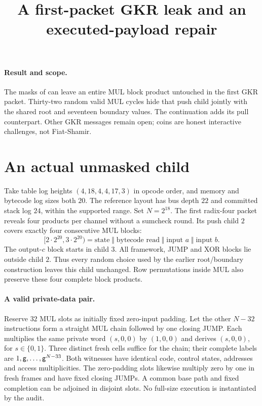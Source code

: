 \documentclass[11pt]{article}
\title{A first-packet GKR leak and an executed-payload repair}
\author{}
\date{}
\begin{document}
\maketitle
\vspace{-2em}

\paragraph{Result and scope.} The masks of  can leave an entire MUL block product untouched in the first GKR packet. Thirty-two random valid MUL cycles hide that push child jointly with the shared root and seventeen boundary values. The continuation  adds its pull counterpart. Other GKR messages remain open; coins are honest interactive challenges, not Fiat-Shamir.

\section{An actual unmasked child}

Take table log heights $(4,18,4,4,17,3)$ in opcode order, and memory and bytecode log sizes both $20$. The reference layout has bus depth $22$ and committed stack log $24$, within the supported range. Set $N=2^{18}$. The first radix-four packet reveals four products per channel without a sumcheck round. Its push child $2$ covers exactly four consecutive MUL blocks:
\[
 [2\cdot2^{20},3\cdot2^{20})
 =\text{state}\;\Vert\;\text{bytecode read}\;\Vert\;\text{input }a\;\Vert\;\text{input }b.
\]
The output-$c$ block starts in child $3$. All framework, JUMP and XOR blocks lie outside child $2$. Thus every random choice used by the earlier root/boundary construction leaves this child unchanged. Row permutations inside MUL also preserve these four complete block products.

\paragraph{A valid private-data pair.} Reserve $32$ MUL slots as initially fixed zero-input padding. Let the other $N-32$ instructions form a straight MUL chain followed by one closing JUMP. Each multiplies the same private word $(s,0,0)$ by $(1,0,0)$ and derives $(s,0,0)$, for $s\in\{0,1\}$. Three distinct fresh cells suffice for the chain; their complete labels are $1,\mathsf{g},\ldots,\mathsf{g}^{N-33}$. Both witnesses have identical code, control states, addresses and access multiplicities. The zero-padding slots likewise multiply zero by one in fresh frames and have fixed closing JUMPs. A common base path and fixed completion can be adjoined in disjoint slots. No full-size execution is instantiated by the audit.
\end{document}
